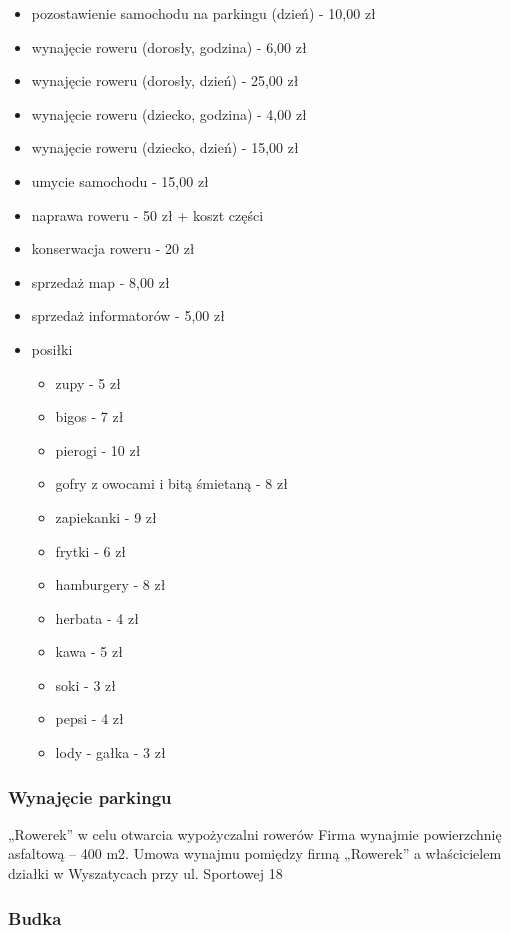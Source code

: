 \documentclass{sprawozdanie-agh}
\begin{document}
		\begin{itemize}
			\item pozostawienie samochodu na parkingu (dzień) - 10,00 zł
			\item wynajęcie roweru (dorosły, godzina) - 6,00 zł
			\item wynajęcie roweru (dorosły, dzień) - 25,00 zł
			\item wynajęcie roweru (dziecko, godzina) - 4,00 zł
			\item wynajęcie roweru (dziecko, dzień) - 15,00 zł
			\item umycie samochodu - 15,00 zł
			\item naprawa roweru - 50 zł + koszt części
			\item konserwacja roweru - 20 zł
			\item sprzedaż map - 8,00 zł
			\item sprzedaż informatorów - 5,00 zł
			\item posiłki
				\begin{itemize}
					\item zupy - 5 zł
					\item bigos - 7 zł
					\item pierogi - 10 zł
					\item gofry z owocami i bitą śmietaną - 8 zł
					\item zapiekanki - 9 zł
					\item frytki - 6 zł
					\item hamburgery - 8 zł
					\item herbata - 4 zł
					\item kawa - 5 zł
					\item soki - 3 zł
					\item pepsi - 4 zł
					\item lody - gałka - 3 zł
				\end{itemize}
		\end{itemize}
		
		\subsubsection{Wynajęcie parkingu}

		„Rowerek” w celu otwarcia wypożyczalni rowerów Firma wynajmie powierzchnię asfaltową – 400 m2. Umowa wynajmu pomiędzy firmą „Rowerek” a właścicielem działki w Wyszatycach przy ul. Sportowej 18
		
		\subsubsection{Budka}
\end{document}
